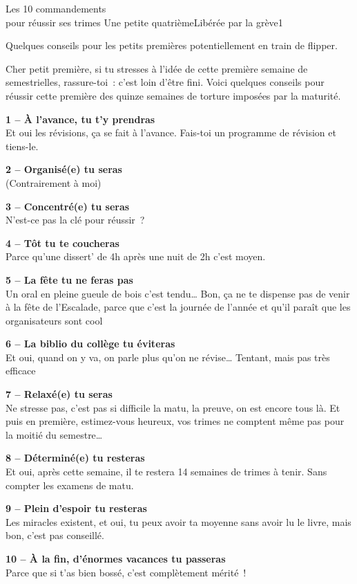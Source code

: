 \documentclass{parch}
\begin{document}
	\begin{parchArticle}{Les 10 commandements\\pour réussir ses trimes}
		{Une petite quatrième}{Libérée par la grève}{1}
		\begin{parchResume}
			Quelques conseils pour les petits premières potentiellement en train de flipper.
		\end{parchResume}
		Cher petit première, si tu stresses à l'idée de cette première semaine de semestrielles, rassure-toi : c'est loin d'être fini. Voici quelques conseils pour réussir cette première des quinze semaines de torture imposées par la maturité.
		
		\textbf{1 -- À l'avance, tu t'y prendras}\\
		Et oui les révisions, ça se fait à l'avance. Fais-toi un programme de révision et tiens-le.
		
		\textbf{2 -- Organisé(e) tu seras}\\
		(Contrairement à moi)
		
		\textbf{3 -- Concentré(e) tu seras}\\
		N'est-ce pas la clé pour réussir ?
		
		\textbf{4 -- Tôt tu te coucheras}\\
		Parce qu'une dissert' de 4h après une nuit de 2h c'est moyen.
		
		\textbf{5 -- La fête tu ne feras pas}\\
		Un oral en pleine gueule de bois c'est tendu… Bon, ça ne te dispense pas de venir à la fête de l'Escalade, parce que c'est la journée de l'année et qu'il paraît que les organisateurs sont cool
		
		\textbf{6 -- La biblio du collège tu éviteras}\\
		Et oui, quand on y va, on parle plus qu'on ne révise… Tentant, mais pas très efficace
		
		\textbf{7 -- Relaxé(e) tu seras}\\
		Ne stresse pas, c'est pas si difficile la matu, la preuve, on est encore tous là. Et puis en première, estimez-vous heureux, vos trimes ne comptent même pas pour la moitié du semestre…
		
		\textbf{8 -- Déterminé(e) tu resteras}\\
		Et oui, après cette semaine, il te restera 14 semaines de trimes à tenir. Sans compter les examens de matu.
		
		\textbf{9 -- Plein d'espoir tu resteras}\\
		Les miracles existent, et oui, tu peux avoir ta moyenne sans avoir lu le livre, mais bon, c'est pas conseillé.
		
		\textbf{10 -- À la fin, d'énormes vacances tu passeras}\\
		Parce que si t'as bien bossé, c'est complètement mérité !
	\end{parchArticle}
	
\end{document}
